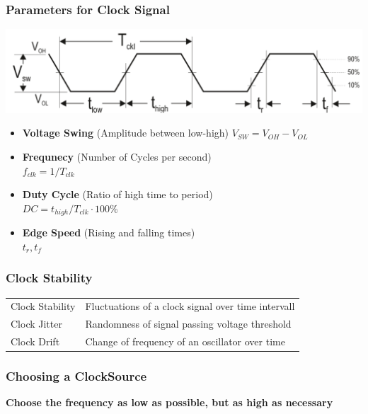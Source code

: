 \subsubsection{Parameters for Clock Signal }
\begin{minipage}{\linewidth}
    \centering
    \includegraphics[width=0.7\linewidth]{images/clock_parameters.png}
\end{minipage}
\begin{minipage}{\linewidth}
    \begin{multicols}{2}
	\begin{itemize}
		\item \textbf{Voltage Swing} (Amplitude between low-high) $V_{SW}=V_{OH}-V_{OL}$
		\item \textbf{Frequnecy} (Number of Cycles per second) \\$f_{clk}=1/T_{clk}$
		\item \textbf{Duty Cycle} (Ratio of high time to period)\\ $DC=t_{high}/T_{clk} \cdot 100 \%$
		\item \textbf{Edge Speed} (Rising and falling times)\\$t_r, t_f$
	\end{itemize}
\end{multicols}
\end{minipage}

\subsubsection{Clock Stability }
\begin{tabular}{ll}
	Clock Stability & Fluctuations of a clock signal over time intervall\\
	Clock Jitter & Randomness of signal passing voltage threshold\\
    Clock Drift & Change of frequency of an oscillator over time\\
\end{tabular}

\subsubsection{Choosing a ClockSource }
\begin{center}
    \begin{minipage}{7cm}
        \centering
        \textbf{Choose the frequency as low as possible, but as high as necessary}
    \end{minipage}
\end{center}

